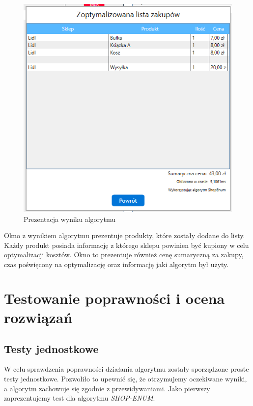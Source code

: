 \documentclass[a4paper]{article}
\let\oldsection\section
\renewcommand\section{\clearpage\oldsection}
\begin{document}
\begin{figure}[H]
\centering
\includegraphics[width=\textwidth,keepaspectratio]{img/modal-optymalizacja.png}
\caption{Prezentacja wyniku algorytmu}
\end{figure}
\begin{flushleft}
Okno z wynikiem algorytmu prezentuje produkty, które zostały dodane do listy. Każdy produkt posiada informację z którego sklepu powinien być kupiony w celu optymalizacji kosztów. Okno to prezentuje również cenę sumaryczną za zakupy, czas poświęcony na optymalizację oraz informację jaki algorytm był użyty.
\end{flushleft}
\section{Testowanie poprawności i ocena rozwiązań}
\subsection{Testy jednostkowe}
W celu sprawdzenia poprawności działania algorytmu zostały sporządzone proste testy jednostkowe. Pozwoliło to upewnić się, że otrzymujemy oczekiwane wyniki, a algorytm zachowuje się zgodnie z przewidywaniami. Jako pierwszy zaprezentujemy test dla algorytmu \textit{SHOP-ENUM}.
\end{document}
